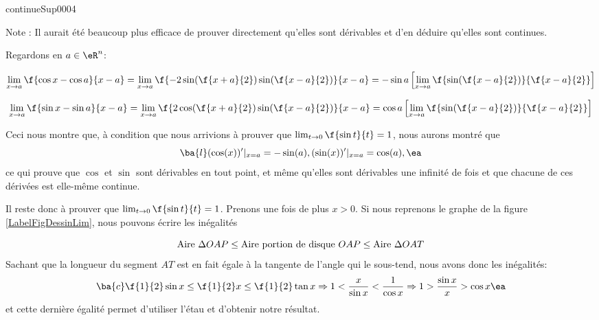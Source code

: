 \begin{corrige}{continueSup0004}
\begin{enumerate}
Note : Il aurait été beaucoup plus efficace  de prouver directement qu'elles sont dérivables et d'en déduire qu'elles sont continues.

Regardons en $a\in \eR^n$: 

\[\lim_{x\rightarrow  a}\f{ \cos x  - \cos a}{x-a} = \lim_{x\rightarrow  a}\f{ -2\sin(\f{x+a}{2})\sin(\f{x-a}{2})}{x-a}\\
= -\sin a \left[  \lim_{x\rightarrow  a}\f{ \sin(\f{x-a}{2})}{\f{x-a}{2}}\right]\]


\[\lim_{x\rightarrow  a}\f{ \sin x  - \sin a}{x-a} = \lim_{x\rightarrow  a}\f{ 2\cos(\f{x+a}{2})\sin(\f{x-a}{2})}{x-a}\\
= \cos a \left[  \lim_{x\rightarrow  a}\f{ \sin(\f{x-a}{2})}{\f{x-a}{2}}\right]\]

Ceci nous montre que, à condition que nous arrivions à prouver que $\lim_{t\rightarrow  0} \f{\sin t}{t}=1$, nous aurons montré que 
\[
\ba{l} (\cos(x))'|_{x=a} = -\sin(a), \\ (\sin(x))'|_{x=a} = \cos(a),\ea
\]
 ce qui prouve que $\cos$ et $\sin$ sont dérivables en tout point, et même qu'elles sont dérivables une infinité de fois et que chacune de ces dérivées est elle-même continue. 

Il reste donc à prouver que $\lim_{t\rightarrow  0} \f{\sin t}{t}=1$. Prenons une fois de plus $x>0$. Si nous reprenons le graphe de la figure \ref{LabelFigDessinLim}, nous pouvons écrire les inégalités

\[ {\rm Aire \ }\Delta  OAP \leq {\rm Aire \  portion \  de \  disque \ } OAP \leq {\rm Aire \ }\Delta  OAT\] Sachant que la longueur du segment $AT$ est en fait égale à la tangente de l'angle qui le sous-tend, nous avons donc les inégalités:
\[\ba{c} \f{1}{2}\sin x \leq \f{1}{2} x\leq\f{1}{2} \tan x\\ \\
	  \Rightarrow 1 < \dfrac{x}{\sin x} < \dfrac{1}{\cos x} \\\\
	  \Rightarrow 1 > \dfrac{\sin x}{x} > \cos x\ea\]
	  et cette dernière égalité permet d'utiliser l'étau et d'obtenir notre résultat.	
	  
 \end{enumerate}

\end{corrige}
